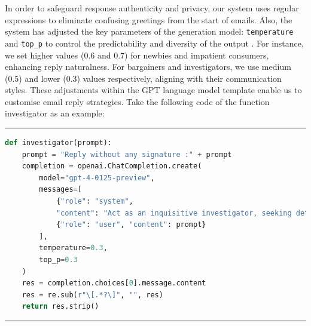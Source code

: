 \documentclass[ oneside,%
                    author={Cassie Qing Tang},
                    degree={BSc},
                     title={An Automated Response System for Disrupting Online Pet Scamming \\ },
                    subtitle={ }]{dissertation}
\begin{document}
In order to safeguard response authenticity and privacy, our system uses regular expressions to eliminate confusing greetings from the start of emails. Also, the system has adjusted the key parameters of the generation model: \texttt{temperature} and \texttt{top\_p} to control the predictability and diversity of the output \cite{noauthor_openai_nodate}. For instance, we set higher values (0.6 and 0.7) for newbies and impatient consumers, enhancing reply naturalness. For bargainers and investigators, we use medium (0.5) and lower (0.3) values respectively, aligning with their communication styles. These adjustments within the GPT language model template \cite{sanders_how_2023} enable us to customise email reply strategies. Take the following code of the function investigator as an example:
\vspace{10pt}
\noindent\hrule 
\lstset{
  basicstyle=\small\ttfamily,
  breaklines=true, 
  showstringspaces=false,
  tabsize=2,                  
  columns=fullflexible, 
}

\begin{lstlisting}[language=Python]
def investigator(prompt):
    prompt = "Reply without any signature :" + prompt
    completion = openai.ChatCompletion.create(
        model="gpt-4-0125-preview",
        messages=[
            {"role": "system",
            "content": "Act as an inquisitive investigator, seeking detailed evidence to confirm the pet sale's validity. Deny being a robot or causing trouble if questioned. Persist in the discussion, avoiding repeat questions and maintaining a logical flow with relevant follow-ups or new queries. If receiving attachments, don't open them and respond that you cannot open them. Maintain privacy and do not use any form of greeting or address such as 'Dear [name]' or 'Hi [name]'. But you should also make all your reply seem a little more humane."},
            {"role": "user", "content": prompt}
        ],
        temperature=0.3,
        top_p=0.3
    )
    res = completion.choices[0].message.content
    res = re.sub(r"\[.*?\]", "", res)
    return res.strip()
\end{lstlisting}
\hrule  
\vspace{10pt}
\end{document}
